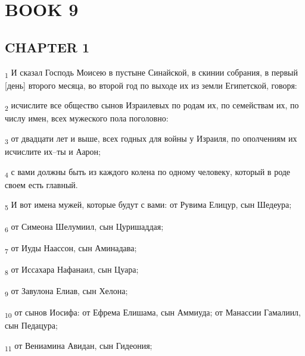 \section{BOOK 9}
\subsection{CHAPTER 1}
\begin{tcolorbox}
\textsubscript{1} И сказал Господь Моисею в пустыне Синайской, в скинии собрания, в первый [день] второго месяца, во второй год по выходе их из земли Египетской, говоря:
\end{tcolorbox}
\begin{tcolorbox}
\textsubscript{2} исчислите все общество сынов Израилевых по родам их, по семействам их, по числу имен, всех мужеского пола поголовно:
\end{tcolorbox}
\begin{tcolorbox}
\textsubscript{3} от двадцати лет и выше, всех годных для войны у Израиля, по ополчениям их исчислите их--ты и Аарон;
\end{tcolorbox}
\begin{tcolorbox}
\textsubscript{4} с вами должны быть из каждого колена по одному человеку, который в роде своем есть главный.
\end{tcolorbox}
\begin{tcolorbox}
\textsubscript{5} И вот имена мужей, которые будут с вами: от Рувима Елицур, сын Шедеура;
\end{tcolorbox}
\begin{tcolorbox}
\textsubscript{6} от Симеона Шелумиил, сын Цуришаддая;
\end{tcolorbox}
\begin{tcolorbox}
\textsubscript{7} от Иуды Наассон, сын Аминадава;
\end{tcolorbox}
\begin{tcolorbox}
\textsubscript{8} от Иссахара Нафанаил, сын Цуара;
\end{tcolorbox}
\begin{tcolorbox}
\textsubscript{9} от Завулона Елиав, сын Хелона;
\end{tcolorbox}
\begin{tcolorbox}
\textsubscript{10} от сынов Иосифа: от Ефрема Елишама, сын Аммиуда; от Манассии Гамалиил, сын Педацура;
\end{tcolorbox}
\begin{tcolorbox}
\textsubscript{11} от Вениамина Авидан, сын Гидеония;
\end{tcolorbox}
